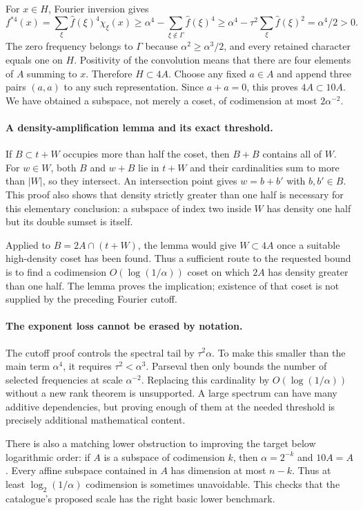 \documentclass[11pt,a4paper]{article}
\begin{document}
For $x\in H$, Fourier inversion gives
\[
 f^{*4}(x)=\sum_\xi\widehat f(\xi)^4\chi_\xi(x)
 \geq\alpha^4-\sum_{\xi\notin\Gamma}\widehat f(\xi)^4
 \geq\alpha^4-\tau^2\sum_\xi\widehat f(\xi)^2
 =\alpha^4/2>0.
\]
The zero frequency belongs to $\Gamma$ because $\alpha^2\geq\alpha^3/2$, and every retained character equals one on $H$. Positivity of the convolution means that there are four elements of $A$ summing to $x$. Therefore $H\subset4A$. Choose any fixed $a\in A$ and append three pairs $(a,a)$ to any such representation. Since $a+a=0$, this proves $4A\subset10A$. We have obtained a subspace, not merely a coset, of codimension at most $2\alpha^{-2}$.

\paragraph{A density-amplification lemma and its exact threshold.}
If $B\subset t+W$ occupies more than half the coset, then $B+B$ contains all of $W$. For $w\in W$, both $B$ and $w+B$ lie in $t+W$ and their cardinalities sum to more than $|W|$, so they intersect. An intersection point gives $w=b+b'$ with $b,b'\in B$. This proof also shows that density strictly greater than one half is necessary for this elementary conclusion: a subspace of index two inside $W$ has density one half but its double sumset is itself.

Applied to $B=2A\cap(t+W)$, the lemma would give $W\subset4A$ once a suitable high-density coset has been found. Thus a sufficient route to the requested bound is to find a codimension $O(\log(1/\alpha))$ coset on which $2A$ has density greater than one half. The lemma proves the implication; existence of that coset is not supplied by the preceding Fourier cutoff.

\paragraph{The exponent loss cannot be erased by notation.}
The cutoff proof controls the spectral tail by $\tau^2\alpha$. To make this smaller than the main term $\alpha^4$, it requires $\tau^2<\alpha^3$. Parseval then only bounds the number of selected frequencies at scale $\alpha^{-2}$. Replacing this cardinality by $O(\log(1/\alpha))$ without a new rank theorem is unsupported. A large spectrum can have many additive dependencies, but proving enough of them at the needed threshold is precisely additional mathematical content.

There is also a matching lower obstruction to improving the target below logarithmic order: if $A$ is a subspace of codimension $k$, then $\alpha=2^{-k}$ and $10A=A$. Every affine subspace contained in $A$ has dimension at most $n-k$. Thus at least $\log_2(1/\alpha)$ codimension is sometimes unavoidable. This checks that the catalogue's proposed scale has the right basic lower benchmark.
\end{document}
